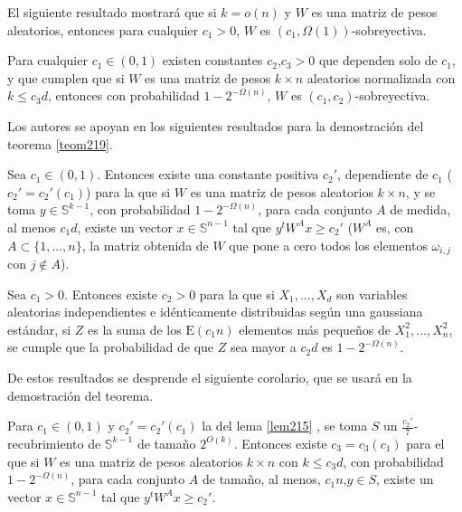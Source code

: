El siguiente resultado mostrará que si $k=o(n)$ y $W$ es una matriz de pesos aleatorios, entonces para cualquier $c_1>0$, $W$ es $(c_1,\Omega(1))$-sobreyectiva.

\begin{teorema} \label{teom219}
Para cualquier $c_1 \in (0,1)$ existen constantes $c_2$,$c_3>0$ que dependen solo de $c_1$, y que cumplen que si $W$ es una matriz de pesos $k \times n$ aleatorios normalizada con $k \leq c_3 d$, entonces con probabilidad $1-2^{-\Omega(n)}$, $W$ es $(c_1,c_2)$-sobreyectiva.
\end{teorema}

Los autores se apoyan en los siguientes resultados para la demostración del teorema \ref{teom219}.

\begin{lema} \label{lem215}
Sea $c_1 \in (0,1)$. Entonces existe una constante positiva $c_2'$, dependiente de $c_1$ ($c_2'=c_2'(c_1)$) para la que si $W$ es una matriz de pesos aleatorios $k \times n$, y se toma $y \in \mathbb{S}^{k-1}$, con probabilidad $1-2^{-\Omega(n)}$, para cada conjunto $A$ de medida, al menos $c_1 d$, existe un vector $x \in \mathbb{S}^{n-1}$ tal que $y^{t} W^Ax \geq c_2'$ ($W^A$ es, con $A \subset \{1,...,n\}$, la matriz obtenida de $W$ que pone a cero todos los elementos $\omega_{i,j}$ con $j \notin A$).
\end{lema}

\begin{lema}
Sea $c_1>0$. Entonces existe $c_2>0$ para la que si $X_1,...,X_d$ son variables aleatorias independientes e idénticamente distribuidas según una gaussiana estándar, si $Z$ es la suma de los $\text{E}(c_1 n)$ elementos más pequeños de $X_1^2,...,X_n^2$, se cumple que la probabilidad de que $Z$ sea mayor a $c_2 d$ es $1-2^{-\Omega(n)}$.
\end{lema}

De estos resultados se desprende el siguiente corolario, que se usará en la demostración del teorema.

\begin{corolario} \label{coro210}
Para $c_1 \in (0,1)$ y $c_2'=c_2'(c_1)$ la del lema \ref{lem215} , se toma $S$ un $\frac{c_2'}{7}$-recubrimiento de $\mathbb{S}^{k-1}$ de tamaño $2^{O(k)}$. Entonces existe $c_3=c_3(c_1)$ para el que si $W$ es una matriz de pesos aleatorios $k \times n$ con $k \leq c_3 d$, con probabilidad $1-2^{-\Omega(n)}$, para cada conjunto $A$ de tamaño, al menos, $c_1 n$,$y \in S$, existe un vector $x \in \mathbb{S}^{n-1}$ tal que $y^{t} W^A x \geq c_2'$.
\end{corolario}

